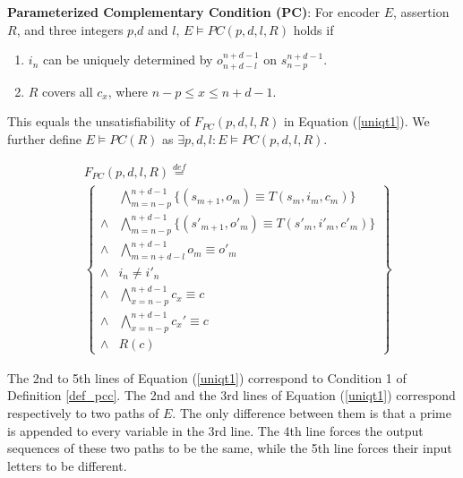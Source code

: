 \documentclass{acm_proc_article-sp}
\begin{document}
\begin{definition11}\label{def_pcc}%
\textbf{Parameterized Complementary Condition (PC)}:
For encoder $E$,
assertion $R$,
and three integers $p$,$d$ and $l$,
$E\vDash PC(p,d,l,R)$ holds if
\begin{enumerate}
 \item $i_n$ can be uniquely determined by $o_{n+d-l}^{n+d-1}$ on $s_{n-p}^{n+d-1}$.
 \item $R$ covers all $c_x$, where $n-p\le x\le n+d-1$.
\end{enumerate}

This equals the unsatisfiability of $F_{PC}(p,d,l,R)$ in Equation (\ref{uniqt1}).
We further define $E\vDash PC(R)$ as $\exists p,d,l:E\vDash PC(p,d,l,R)$.
\end{definition11}

\begin{equation}\label{uniqt1}
\begin{split}
&F_{PC}(p,d,l,R)\stackrel{def}{=}\\
&\left\{
\begin{array}{cc}
&\bigwedge_{m=n-p}^{n+d-1}
\{
(s_{m+1},o_m)\equiv T(s_m,i_m,c_m)
\}
\\
\wedge&\bigwedge_{m=n-p}^{n+d-1}
\{
(s'_{m+1},o'_m)\equiv T(s'_m,i'_m,c'_m)
\}
\\
\wedge&\bigwedge_{m=n+d-l}^{n+d-1}o_m\equiv o'_m \\
\wedge& i_n\ne i'_n \\
\wedge&\bigwedge_{x=n-p}^{n+d-1}c_x\equiv c \\
\wedge&\bigwedge_{x=n-p}^{n+d-1}c_x'\equiv c \\
\wedge& R(c)
\end{array}
\right\}
\end{split}
\end{equation}


The 2nd to 5th lines of Equation (\ref{uniqt1}) correspond to Condition 1 of Definition \ref{def_pcc}.
The 2nd and the 3rd lines of Equation (\ref{uniqt1}) correspond respectively to two paths of $E$.
The only difference between them is that a prime is appended to every variable in the 3rd line.
The 4th line forces the output sequences of these two paths to be the same,
while the 5th line forces their input letters to be different.
\end{document}
